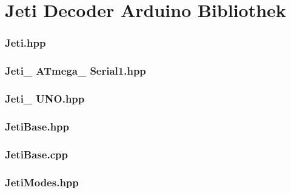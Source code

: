 \section{Jeti Decoder Arduino Bibliothek}
\subsubsection{Jeti.hpp}

\subsubsection{Jeti\_ ATmega\_ Serial1.hpp}

\subsubsection{Jeti\_ UNO.hpp}

\subsubsection{JetiBase.hpp}

\subsubsection{JetiBase.cpp}

\subsubsection{JetiModes.hpp}
